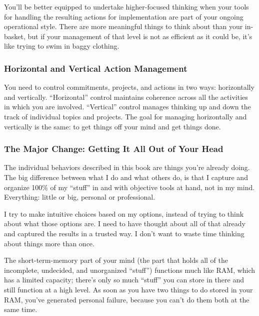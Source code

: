 \documentclass[letterpaper]{article}
\newcommand{\p}{\vspace{1em}\par}		%
\begin{document}
\p You'll be better equipped to undertake higher-focused thinking when your tools for handling the resulting actions for implementation are part of your ongoing operational style. There are more meaningful things to think about than your in-basket, but if your management of that level is not as efficient as it could be, it's like trying to swim in baggy clothing.

\subsubsection*{Horizontal and Vertical Action Management}
You need to control commitments, projects, and actions in two ways: horizontally and vertically. ``Horizontal'' control maintains coherence across all the activities in which you are involved.
``Vertical'' control manages thinking up and down the track of individual topics and projects.
The goal for managing horizontally and vertically is the same: to get things off your mind and get things done.

\subsubsection*{The Major Change: Getting It All Out of Your Head}
The individual behaviors described in this book are things you're already doing. The big difference between what I do and what others do, is that I capture and organize 100\% of my ``stuff'' in and with objective tools at hand, not in my mind. Everything: little or big, personal or professional.

\p I try to make intuitive choices based on my options, instead of trying to think about what those options are. I need to have thought about all of that already and captured the results in a trusted way. I don't want to waste time thinking about things more than once.

\p The short-term-memory part of your mind (the part that holds all of the incomplete, undecided, and unorganized ``stuff'') functions much like RAM, which has a limited capacity; there's only so much ``stuff'' you can store in there and still function at a high level. As soon as you have two things to do stored in your RAM, you've generated personal failure, because you can't do them both at the same time.
\end{document}
